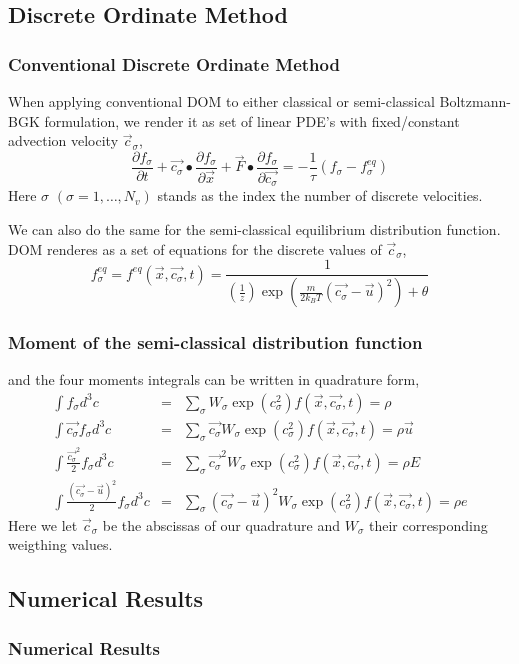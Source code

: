 \subsection{Discrete Ordinate Method}
\begin{frame}
	\frametitle{Conventional Discrete Ordinate Method}
	When applying conventional DOM to either classical or semi-classical Boltzmann-BGK formulation, we render it as set of linear PDE's with fixed/constant advection velocity $\vec{c}_\sigma$,
	\begin{equation}
	\frac{\partial{f_\sigma}}{\partial{t}} +
	\vec{c_\sigma}\bullet\frac{\partial{f_\sigma}}{\partial{\vec{x}}} +
	\vec{F}\bullet\frac{\partial{f_\sigma}}{\partial{\vec{c_\sigma}}} = 
	-\frac{1}{\tau}(f_\sigma-f^{eq}_\sigma)
	\end{equation}
Here $\sigma$ $(\sigma = 1,\dots,N_v)$ stands as the index the number of discrete velocities. 
\end{frame}

\begin{frame}
We can also do the same for the semi-classical equilibrium distribution function. DOM renderes as a set of equations for the discrete values of $\vec{c}_\sigma$,
	\begin{equation}
	f_\sigma^{eq}=f^{eq}(\vec{x},\vec{c_\sigma},t)=\frac{1}{(\frac{1}{z})\exp\left({\frac{m}{2 k_B T}(\vec{c_\sigma}-\vec{u})^2}\right)+\theta}
	\end{equation}
\end{frame}

\begin{frame}
	\frametitle{Moment of the semi-classical distribution function}
	and the four moments integrals can be written in quadrature form, 
	\begin{eqnarray}
	\int f_\sigma d^3 c &=& \sum_\sigma W_\sigma \exp{(c_\sigma^2)} f(\vec{x},\vec{c_\sigma},t) = \rho \\
	\int \vec{c_\sigma} f_\sigma d^3 c &=& \sum_\sigma \vec{c_\sigma} W_\sigma \exp{(c_\sigma^2)} f(\vec{x},\vec{c_\sigma},t) = \rho \vec{u} \nonumber \\
	\int \frac{\vec{c_\sigma}^2}{2} f_\sigma d^3 c &=& \sum_\sigma \vec{c_\sigma}^2 W_\sigma \exp{(c_\sigma^2)} f(\vec{x},\vec{c_\sigma},t) = \rho E \nonumber \\
	\int \frac{(\vec{c_\sigma}-\vec{u})^2}{2} f_\sigma d^3 c &=& \sum_\sigma (\vec{c_\sigma}-\vec{u})^2 W_\sigma \exp{(c_\sigma^2)} f(\vec{x},\vec{c_\sigma},t) = \rho e \nonumber
	\end{eqnarray}
	Here we let $\vec{c}_\sigma$ be the abscissas of our quadrature and $W_\sigma$ their corresponding weigthing values. 
\end{frame} 

\subsection{Numerical Results}

\begin{frame}
	\frametitle{Numerical Results}
	
\end{frame}